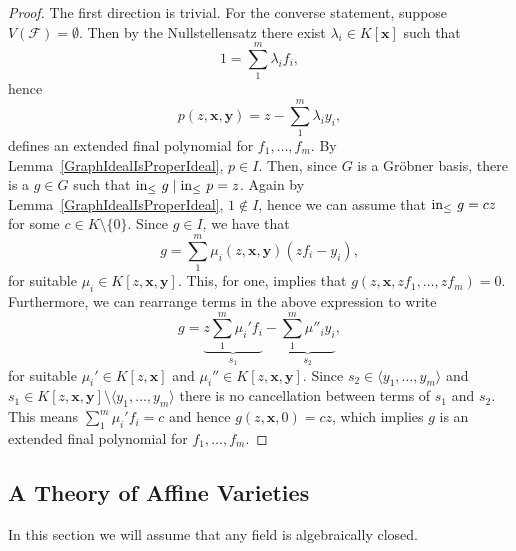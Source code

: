 \begin{proof}
    The first direction is trivial. For the converse statement, suppose $V(\mathcal{F}) = \emptyset$. Then by the Nullstellensatz there exist $\lambda_i\in K[\mathbf{x}]$ such that 
    $$1 = \sum_1^m \lambda_i f_i,$$
    hence
    $$p(z,\mathbf{x},\mathbf{y}) = z - \sum_1^m \lambda_i y_i,$$
    defines an extended final polynomial for $f_1,\dots,f_m$. By Lemma~\ref{GraphIdealIsProperIdeal}, $p\in I$. Then, since $G$ is a Gröbner basis, there is a $g\in G$ such that 
    $\mathrm{in}_\leq\ g \mid \mathrm{in}_\leq\ p = z$. Again by Lemma~\ref{GraphIdealIsProperIdeal}, $1\notin I$, hence we can assume that $\mathrm{in}_\leq \ g = cz$ for some $c\in K\setminus\{0\}$. Since $g\in I$, we have that 
    \begin{equation*}
        g = \sum_1^m \mu_i(z,\mathbf{x},\mathbf{y}) (zf_i -y_i),
    \end{equation*}
    for suitable $\mu_i \in K[z,\mathbf{x},\mathbf{y}]$. This, for one, implies that $g(z,\mathbf{x},zf_1,\dots,zf_m)=0$. Furthermore, we can rearrange terms in the above expression to write 
    $$g = \underbrace{z\sum_1^m \mu_i'f_i}_{s_1} - \underbrace{\sum_1^m \mu''_iy_i}_{s_2},$$
    for suitable $\mu_i'\in K[z,\mathbf{x}]$ and $\mu_i''\in K[z,\mathbf{x},\mathbf{y}]$.
    Since $s_2\in \langle y_1,\dots,y_m\rangle$ and\\ $s_1\in K[z,\mathbf{x},\mathbf{y}]\setminus \langle y_1,\dots,y_m\rangle$ there is no cancellation between terms of $s_1$ and $s_2$. This means $\sum_1^m\mu_i'f_i=c$ and hence $g(z,\mathbf{x},0)=cz$, which implies $g$ is an extended final polynomial for $f_1,\dots,f_m$.
\end{proof}
\subsection{A Theory of Affine Varieties}
In this section we will assume that any field is algebraically closed.
